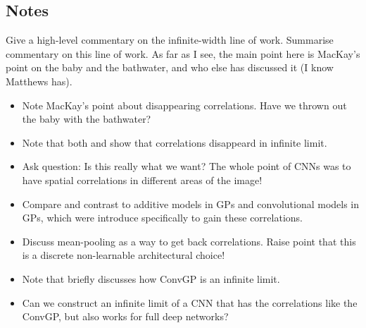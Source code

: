 \documentclass{article}
\theoremstyle{definition}
\newcommand{\adriacomment}[1]{\todo[color=blue]{#1}\xspace}
\newcommand{\vX}{\mathbf{X}}
\newcommand{\vW}{\mathbf{W}}
\begin{document}






\subsection{Notes}

Give a high-level commentary on the infinite-width line of work. Summarise commentary on this line of work. As far as I see, the main point here is MacKay's point on the baby and the bathwater, and who else has discussed it (I know Matthews has).
\begin{itemize}
    \item Note MacKay's point about disappearing correlations. Have we thrown out the baby with the bathwater?
    \item Note that both \citet{garriga2018infiniteconv} and \citet{novak2019infiniteconv} show that correlations disappeard in infinite limit.
    \item Ask question: Is this really what we want? The whole point of CNNs was to have spatial correlations in different areas of the image!
    \item Compare and contrast to additive models in GPs and convolutional models in GPs, which were introduce specifically to gain these correlations.
    \item Discuss mean-pooling as a way to get back correlations. Raise point that this is a discrete non-learnable architectural choice!
    \item Note that \citet{vdw2019thesis} briefly discusses how ConvGP is an infinite limit.
    \item Can we construct an infinite limit of a CNN that has the correlations like the ConvGP, but also works for full deep networks?
\end{itemize}
\end{document}
